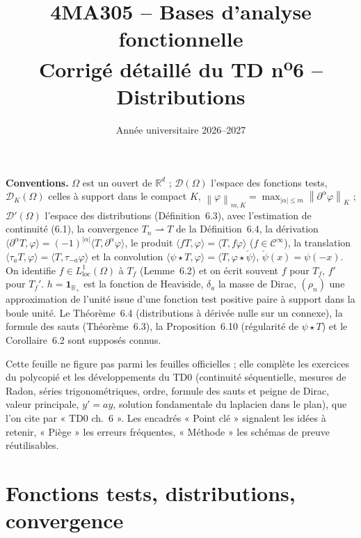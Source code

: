 \documentclass[11pt,a4paper]{article}
\title{\textbf{4MA305 -- Bases d'analyse fonctionnelle}\\[2mm]
\Large Corrigé détaillé du TD n\textsuperscript{o}6 -- Distributions}
\author{}
\date{Année universitaire 2026--2027}
\newcommand{\R}{\mathbb{R}}
\newcommand{\norm}[1]{\left\|#1\right\|}
\newcommand{\Cinf}{\mathcal{C}^\infty}
\newcommand{\wk}{\rightharpoonup}
\newcommand{\D}{\mathcal{D}}
\theoremstyle{definition}
\begin{document}
\maketitle

\begin{commentaire}
\textbf{Conventions.} $\Omega$ est un ouvert de $\R^d$ ; $\D(\Omega)$ l'espace des fonctions tests, $\D_K(\Omega)$ celles à support dans le compact $K$, $\norm\varphi_{m,K}=\max_{|\alpha|\le m}\norm{\partial^\alpha\varphi}_K$ ; $\D'(\Omega)$ l'espace des distributions (Définition~6.3), avec l'estimation de continuité (6.1), la convergence $T_n\wk T$ de la Définition~6.4, la dérivation $\langle\partial^\alpha T,\varphi\rangle=(-1)^{|\alpha|}\langle T,\partial^\alpha\varphi\rangle$, le produit $\langle fT,\varphi\rangle=\langle T,f\varphi\rangle$ ($f\in\Cinf$), la translation $\langle\tau_aT,\varphi\rangle=\langle T,\tau_{-a}\varphi\rangle$ et la convolution $\langle\psi\star T,\varphi\rangle=\langle T,\varphi\star\check\psi\rangle$, $\check\psi(x)=\psi(-x)$. On identifie $f\in L^1_{\mathrm{loc}}(\Omega)$ à $T_f$ (Lemme~6.2) et on écrit souvent $f$ pour $T_f$, $f'$ pour $T_f'$. $h=\mathbf 1_{\R_+}$ est la fonction de Heaviside, $\delta_a$ la masse de Dirac, $(\rho_n)$ une approximation de l'unité issue d'une fonction test positive paire à support dans la boule unité. Le Théorème~6.4 (distributions à dérivée nulle sur un connexe), la formule des sauts (Théorème~6.3), la Proposition~6.10 (régularité de $\psi\star T$) et le Corollaire~6.2 sont supposés connus.

Cette feuille ne figure pas parmi les feuilles officielles ; elle complète les exercices du polycopié et les développements du TD0 (continuité séquentielle, mesures de Radon, séries trigonométriques, ordre, formule des sauts et peigne de Dirac, valeur principale, $y'=ay$, solution fondamentale du laplacien dans le plan), que l'on cite par « TD0 ch.~6 ». Les encadrés « Point clé » signalent les idées à retenir, « Piège » les erreurs fréquentes, « Méthode » les schémas de preuve réutilisables.
\end{commentaire}

\section*{Fonctions tests, distributions, convergence}
\end{document}
